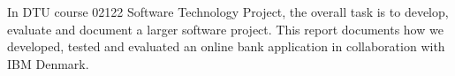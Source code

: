 
In DTU course 02122 Software Technology Project, the overall task is to develop, evaluate and document a larger software project. This report documents how we developed, tested and evaluated an online bank application in collaboration with IBM Denmark.